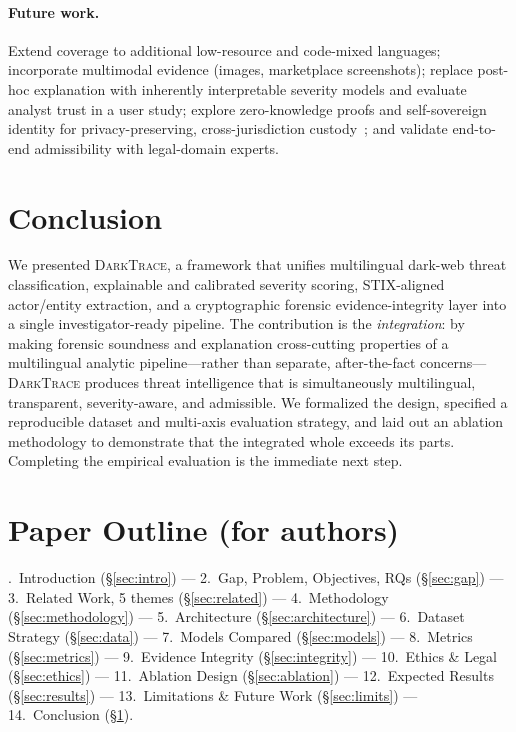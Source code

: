 \documentclass[11pt,a4paper]{article}
\newcommand{\framework}{\textsc{DarkTrace}}
\begin{document}
\paragraph{Future work.} Extend coverage to additional low-resource and code-mixed
languages; incorporate multimodal evidence (images, marketplace screenshots); replace
post-hoc explanation with inherently interpretable severity models and evaluate analyst
trust in a user study; explore zero-knowledge proofs and self-sovereign identity for
privacy-preserving, cross-jurisdiction custody~\cite{loffi2025management}; and validate
end-to-end admissibility with legal-domain experts.

\section{Conclusion}\label{sec:conclusion}

We presented \framework{}, a framework that unifies multilingual dark-web threat
classification, explainable and calibrated severity scoring, STIX-aligned actor/entity
extraction, and a cryptographic forensic evidence-integrity layer into a single
investigator-ready pipeline. The contribution is the \emph{integration}: by making
forensic soundness and explanation cross-cutting properties of a multilingual analytic
pipeline---rather than separate, after-the-fact concerns---\framework{} produces threat
intelligence that is simultaneously multilingual, transparent, severity-aware, and
admissible. We formalized the design, specified a reproducible dataset and multi-axis
evaluation strategy, and laid out an ablation methodology to demonstrate that the
integrated whole exceeds its parts. Completing the empirical evaluation is the immediate
next step.

\section*{Paper Outline (for authors)}\label{sec:outline}
.~Introduction (\S\ref{sec:intro}) ---
2.~Gap, Problem, Objectives, RQs (\S\ref{sec:gap}) ---
3.~Related Work, 5 themes (\S\ref{sec:related}) ---
4.~Methodology (\S\ref{sec:methodology}) ---
5.~Architecture (\S\ref{sec:architecture}) ---
6.~Dataset Strategy (\S\ref{sec:data}) ---
7.~Models Compared (\S\ref{sec:models}) ---
8.~Metrics (\S\ref{sec:metrics}) ---
9.~Evidence Integrity (\S\ref{sec:integrity}) ---
10.~Ethics \& Legal (\S\ref{sec:ethics}) ---
11.~Ablation Design (\S\ref{sec:ablation}) ---
12.~Expected Results (\S\ref{sec:results}) ---
13.~Limitations \& Future Work (\S\ref{sec:limits}) ---
14.~Conclusion (\S\ref{sec:conclusion}).



\end{document}
